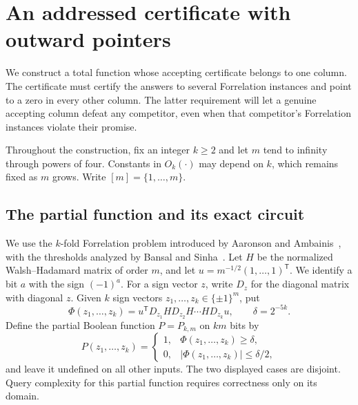 \section{An addressed certificate with outward pointers}
\label{sec:construction}

We construct a total function whose accepting certificate belongs to one
column.  The certificate must certify the answers to several Forrelation
instances and point to a zero in every other column.  The latter requirement
will let a genuine accepting column defeat any competitor, even when that
competitor's Forrelation instances violate their promise.

Throughout the construction, fix an integer $k\geq 2$ and let $m$ tend to
infinity through powers of four.  Constants in $O_k(\cdot)$ may depend on
$k$, which remains fixed as $m$ grows.  Write $[m]=\{1,\ldots,m\}$.

\subsection{The partial function and its exact circuit}

We use the $k$-fold Forrelation problem introduced by Aaronson and
Ambainis~\cite{AA18}, with the thresholds analyzed by Bansal and
Sinha~\cite{BS21}. Let $H$ be the normalized Walsh--Hadamard matrix of order $m$, and let
$u=m^{-1/2}(1,\ldots,1)^{\mathsf T}$.  We identify a bit $a$ with the sign
$(-1)^a$.  For a sign vector $z$, write $D_z$ for the diagonal matrix with
diagonal $z$.  Given $k$ sign vectors $z_1,\ldots,z_k\in\{\pm1\}^m$, put
\begin{equation}\label{eq:forrelation-form}
 \Phi(z_1,\ldots,z_k)
 =u^{\mathsf T}D_{z_1}H D_{z_2}H\cdots H D_{z_k}u,
 \qquad \delta=2^{-5k}.
\end{equation}
Define the partial Boolean function $P=P_{k,m}$ on $km$ bits by
\begin{equation}\label{eq:forrelation-promise}
 P(z_1,\ldots,z_k)=
 \begin{cases}
  1,&\Phi(z_1,\ldots,z_k)\geq\delta,\\
  0,&|\Phi(z_1,\ldots,z_k)|\leq\delta/2,
 \end{cases}
\end{equation}
and leave it undefined on all other inputs.  The two displayed cases are
disjoint.  Query complexity for this partial function requires correctness
only on its domain.

